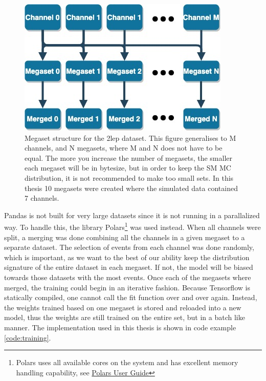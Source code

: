 \begin{figure}[H]
    \centering
    \includegraphics[width=0.6\linewidth]{Figures/2lep_config/megaset_struct.jpeg}
    \caption[Megaset structure diagram]{Megaset structure for the 2lep dataset. This figure generalises to M channels, and N megasets, 
    where M and N does not have to be equal. The more you increase the number of megasets, 
    the smaller each megaset will be in bytesize, but in order to keep the SM MC distribution, it is not recommended to make too small sets. 
    In this thesis 10 megasets were created where the simulated data contained 7 channels. }
    \label{fig:2lep_struct}
\end{figure}

Pandas is not built for very large datasets since it is not running in a parallalized way. To handle this, the library
Polars\footnote{Polars uses all available cores on the system and has excellent memory 
handling capability, see \href{https://pola-rs.github.io/polars-book/user-guide/}{Polars User Guide}}
\cite{ritchie_vink_2023_7744139} was used instead. When all channels were split, a merging was done combining all the channels in a given 
megaset to a separate dataset. The selection of events from each channel was done randomly, 
which is important, as we want to the best of our ability keep the distribution signature of the entire dataset in each megaset. If not, the model will 
be biased towards those datasets with the most events. Once each of the megasets where merged, the training could begin in an iterative fashion. Because
Tensorflow is statically compiled, one cannot call the fit function over and over again. Instead, the weights trained based on one megaset is stored and 
reloaded into a new model, thus the weights are still trained on the entire set, but in a batch like manner. 
The implementation used in this thesis is shown in code example \ref{code:training}.



